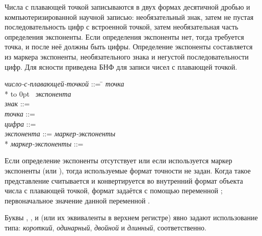 Числа с плавающей точкой записываются в двух формах десятичной дробью и
компьютеризированной научной записью: необязательный знак, затем не пустая
последовательность цифр с встроенной точкой, затем необязательная
часть определения экспоненты.
Если определения экспоненты нет, тогда требуется точка, и после неё должны быть
цифры.
Определение экспоненты составляется из маркера экспоненты, необязательного знака
и негустой последовательности цифр.
Для ясности приведена БНФ для записи чисел с плавающей точкой.

\begin{tabbing}
\emph{число-с-плавающей-точкой} ::= \=  {\it
точка}   \\*
\>\hbox to 0pt{\hss\Mor~}   {\it
экспонента} \\
\emph{знак} ::= \cd{+} {\Mor} \cd{-} \\
\emph{точка} ::=  \\
\emph{цифра} ::=  {\Mor}  {\Mor}  {\Mor}  {\Mor} 
         {\Mor}  {\Mor}  {\Mor}  {\Mor}  {\Mor} \\
\emph{экспонента} ::= \emph{маркер-экспоненты}  \\*
\emph{маркер-экспоненты} ::=  {\Mor}  {\Mor} 
{\Mor}  {\Mor}  {\Mor}  {\Mor}  {\Mor}  {\Mor}
 {\Mor} 
\end{tabbing}

Если определение экспоненты отсутствует или если используется маркер
экспоненты  (или ), тогда используемые формат точности не
задан. Когда такое представление считывается и конвертируется во внутренний
формат объекта числа с плавающей точкой, формат задаётся с помощью
переменной ; первоначальное значение данной
переменной .

Буквы  , ,  и  (или их эквиваленты в верхнем регистре)
явно задают использование типа: \emph{короткий}, \emph{одинарный}, \emph{двойной} и
\emph{длинный}, соответственно.

